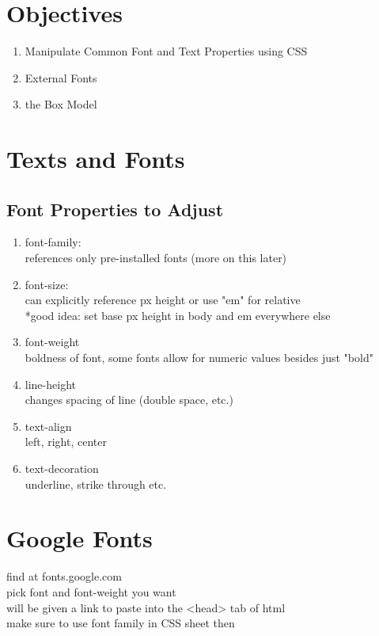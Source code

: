 \documentclass{article}
\begin{document}
	
	\title{}
	\author{Nico Limacher}
	
\maketitle
\section{Objectives}

\begin{enumerate}
	\itemsep0em
	\item Manipulate Common Font and Text Properties using CSS
	\item External Fonts
	\item the Box Model
\end{enumerate}

\section{Texts and Fonts}
	\subsection*{Font Properties to Adjust}
	\begin{enumerate}
		\itemsep0em
		\item font-family:
		\\references only pre-installed fonts (more on this later)
		\item font-size:
		\\can explicitly reference px height or use "em" for relative
		\\*good idea: set base px height in body and em everywhere else
		\item font-weight
		\\boldness of font, some fonts allow for numeric values besides just "bold"
		\item line-height
		\\changes spacing of line (double space, etc.)
		\item text-align
		\\left, right, center
		\item text-decoration
		\\underline, strike through etc.
	\end{enumerate}

\section{Google Fonts}
	find at fonts.google.com
	\\pick font and font-weight you want
	\\will be given a link to paste into the <head> tab of html
	\\make sure to use font family in CSS sheet then
	
\end{document}
